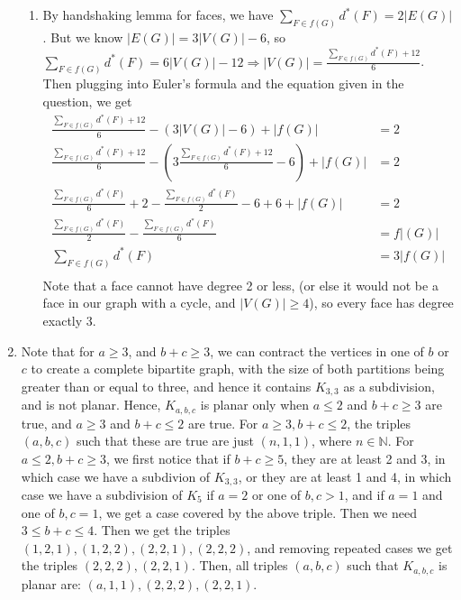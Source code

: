 \documentclass[10pt,english]{article}
\begin{document}
\begin{enumerate}
\begin{enumerate}
    
    \item By handshaking lemma for faces, we have $\sum_{F\in f(G)}d^*(F)=2|E(G)|$. But we know $|E(G)|=3|V(G)|-6$, so $\sum_{F\in f(G)}d^*(F)=6|V(G)|-12\Rightarrow |V(G)|=\frac{\sum_{F\in f(G)}d^*(F)+12}{6}$. Then plugging into Euler's formula and the equation given in the question, we get 
    \begin{align*}
    \frac{\sum_{F\in f(G)}d^*(F)+12}{6}-\left(3|V(G)|-6\right)+|f(G)|&=2 \\ 
    \frac{\sum_{F\in f(G)}d^*(F)+12}{6}-\left(3\frac{\sum_{F\in f(G)}d^*(F)+12}{6}-6\right)+|f(G)|&=2 \\ 
    \frac{\sum_{F\in f(G)}d^*(F)}{6}+2-\frac{\sum_{F\in f(G)}d^*(F)}{2}-6+6+|f(G)|&=2 \\
    \frac{\sum_{F\in f(G)}d^*(F)}{2}-\frac{\sum_{F\in f(G)}d^*(F)}{6}&=f|(G)|\\
    \sum_{F\in f(G)}d^*(F)&=3|f(G)|\\
    \end{align*}
    Note that a face cannot have degree 2 or less, (or else it would not be a face in our graph with a cycle, and $|V(G)|\geq4$), so every face has degree exactly 3.
\end{enumerate}

\pagebreak
\item Note that for $a\geq3$, and $b+c\geq3$, we can contract the vertices in one of $b$ or $c$ to create a complete bipartite graph, with the size of both partitions being greater than or equal to three, and hence it contains $K_{3,3}$ as a subdivision, and is not planar. Hence, $K_{a,b,c}$ is planar only when $a\leq2$ and $b+c\geq3$ are true, and $a\geq3$ and $b+c\leq2$ are true. For $a\geq3, b+c\leq2$, the triples $(a,b,c)$ such that these are true are just $(n,1,1)$, where $n\in\mathbb{N}$. For $a\leq2,b+c\geq3$, we first notice that if $b+c\geq5$, they are at least 2 and 3, in which case we have a subdivion of $K_{3,3}$, or they are at least 1 and 4, in which case we have a subdivision of $K_{5}$ if $a=2$ or one of $b,c>1$, and if $a=1$ and one of $b,c=1$, we get a case covered by the above triple. Then we need $3\leq b+c\leq4$. Then we get the triples $(1,2,1),(1,2,2),(2,2,1),(2,2,2)$, and removing repeated cases we get the triples $(2,2,2),(2,2,1)$. Then, all triples $(a,b,c)$ such that $K_{a,b,c}$ is planar are: $(a,1,1), (2,2,2), (2,2,1)$.

\end{enumerate}
\end{document}
